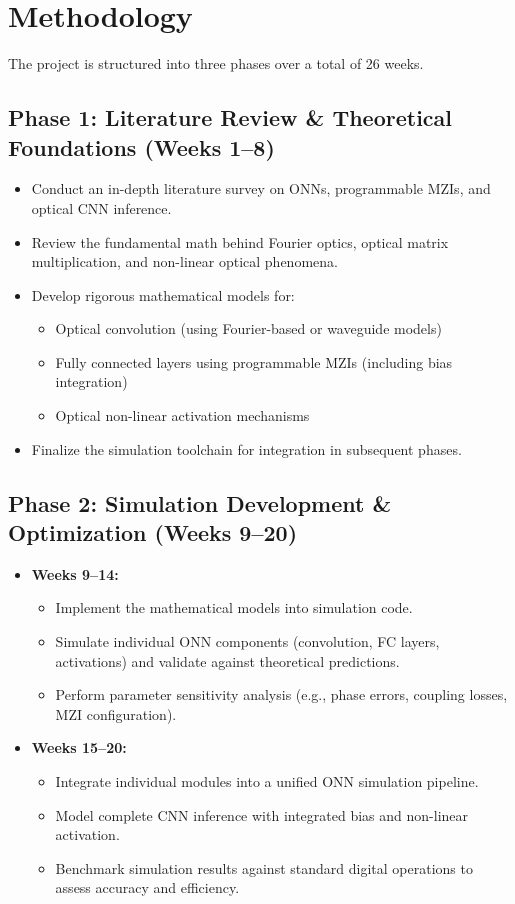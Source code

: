 \documentclass[conference]{IEEEtran}
\begin{document}
\section{Methodology}
The project is structured into three phases over a total of 26 weeks.

\subsection{Phase 1: Literature Review \& Theoretical Foundations (Weeks 1--8)}
\begin{itemize}
    \item Conduct an in-depth literature survey on ONNs, programmable MZIs, and optical CNN inference.
    \item Review the fundamental math behind Fourier optics, optical matrix multiplication, and non-linear optical phenomena.
    \item Develop rigorous mathematical models for:
    \begin{itemize}
        \item Optical convolution (using Fourier-based or waveguide models)
        \item Fully connected layers using programmable MZIs (including bias integration)
        \item Optical non-linear activation mechanisms
    \end{itemize}
    \item Finalize the simulation toolchain for integration in subsequent phases.
\end{itemize}

\subsection{Phase 2: Simulation Development \& Optimization (Weeks 9--20)}
\begin{itemize}
    \item \textbf{Weeks 9--14:}
    \begin{itemize}
        \item Implement the mathematical models into simulation code.
        \item Simulate individual ONN components (convolution, FC layers, activations) and validate against theoretical predictions.
        \item Perform parameter sensitivity analysis (e.g., phase errors, coupling losses, MZI configuration).
    \end{itemize}
    \item \textbf{Weeks 15--20:}
    \begin{itemize}
        \item Integrate individual modules into a unified ONN simulation pipeline.
        \item Model complete CNN inference with integrated bias and non-linear activation.
        \item Benchmark simulation results against standard digital operations to assess accuracy and efficiency.
    \end{itemize}
\end{itemize}
\end{document}
